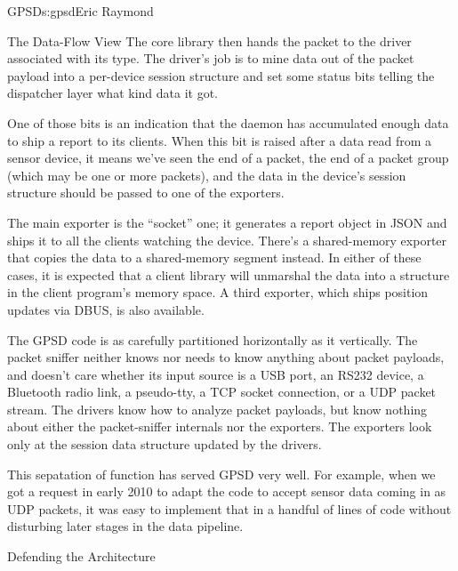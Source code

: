 \begin{aosachapter}{GPSD}{s:gpsd}{Eric Raymond}
\begin{aosasect1}{The Data-Flow View}
The core library then hands the packet to the driver associated with
its type.  The driver's job is to mine data out of the packet payload
into a per-device session structure and set some status bits telling
the dispatcher layer what kind data it got.


One of those bits is an indication that the daemon has accumulated
enough data to ship a report to its clients.  When this bit is raised
after a data read from a sensor device, it means we've seen the end of
a packet, the end of a packet group (which may be one or more
packets), and the data in the device's session structure should be
passed to one of the exporters.


The main exporter is the ``socket'' one; it generates a report object
in JSON and ships it to all the clients watching the device. There's a
shared-memory exporter that copies the data to a shared-memory segment
instead. In either of these cases, it is expected that a client
library will unmarshal the data into a structure in the client
program's memory space.  A third exporter, which ships position
updates via DBUS, is also available.

The GPSD code is as carefully partitioned horizontally as it
vertically.  The packet sniffer neither knows nor needs to know
anything about packet payloads, and doesn't care whether its input
source is a USB port, an RS232 device, a Bluetooth radio link, a
pseudo-tty, a TCP socket connection, or a UDP packet stream.  The
drivers know how to analyze packet payloads, but know nothing about
either the packet-sniffer internals nor the exporters.  The exporters
look only at the session data structure updated by the drivers.

This sepatation of function has served GPSD very well. For example,
when we got a request in early 2010 to adapt the code to accept sensor
data coming in as UDP packets, it was easy to implement that in a
handful of lines of code without disturbing later stages in the data
pipeline.


\end{aosasect1}

\begin{aosasect1}{Defending the Architecture}


\end{aosasect1}
\end{aosachapter}

